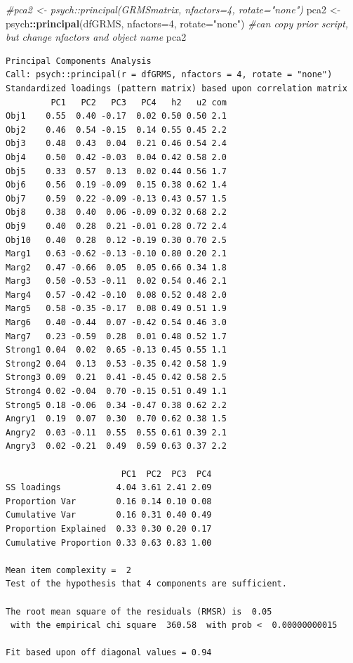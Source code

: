 \documentclass[
  english,
]{book}
\newenvironment{Shaded}{\begin{snugshade}}{\end{snugshade}}
\newcommand{\CommentTok}[1]{\textcolor[rgb]{0.56,0.35,0.01}{\textit{#1}}}
\newcommand{\DataTypeTok}[1]{\textcolor[rgb]{0.13,0.29,0.53}{#1}}
\newcommand{\DecValTok}[1]{\textcolor[rgb]{0.00,0.00,0.81}{#1}}
\newcommand{\KeywordTok}[1]{\textcolor[rgb]{0.13,0.29,0.53}{\textbf{#1}}}
\newcommand{\NormalTok}[1]{#1}
\newcommand{\OperatorTok}[1]{\textcolor[rgb]{0.81,0.36,0.00}{\textbf{#1}}}
\newcommand{\StringTok}[1]{\textcolor[rgb]{0.31,0.60,0.02}{#1}}
\begin{document}
\begin{Shaded}
\begin{Highlighting}[]
\CommentTok{#pca2 <- psych::principal(GRMSmatrix, nfactors=4, rotate="none")}
\NormalTok{pca2 <-}\StringTok{ }\NormalTok{psych}\OperatorTok{::}\KeywordTok{principal}\NormalTok{(dfGRMS, }\DataTypeTok{nfactors=}\DecValTok{4}\NormalTok{, }\DataTypeTok{rotate=}\StringTok{"none"}\NormalTok{) }\CommentTok{#can copy prior script, but change nfactors and object name}
\NormalTok{pca2}
\end{Highlighting}
\end{Shaded}

\begin{verbatim}
Principal Components Analysis
Call: psych::principal(r = dfGRMS, nfactors = 4, rotate = "none")
Standardized loadings (pattern matrix) based upon correlation matrix
         PC1   PC2   PC3   PC4   h2   u2 com
Obj1    0.55  0.40 -0.17  0.02 0.50 0.50 2.1
Obj2    0.46  0.54 -0.15  0.14 0.55 0.45 2.2
Obj3    0.48  0.43  0.04  0.21 0.46 0.54 2.4
Obj4    0.50  0.42 -0.03  0.04 0.42 0.58 2.0
Obj5    0.33  0.57  0.13  0.02 0.44 0.56 1.7
Obj6    0.56  0.19 -0.09  0.15 0.38 0.62 1.4
Obj7    0.59  0.22 -0.09 -0.13 0.43 0.57 1.5
Obj8    0.38  0.40  0.06 -0.09 0.32 0.68 2.2
Obj9    0.40  0.28  0.21 -0.01 0.28 0.72 2.4
Obj10   0.40  0.28  0.12 -0.19 0.30 0.70 2.5
Marg1   0.63 -0.62 -0.13 -0.10 0.80 0.20 2.1
Marg2   0.47 -0.66  0.05  0.05 0.66 0.34 1.8
Marg3   0.50 -0.53 -0.11  0.02 0.54 0.46 2.1
Marg4   0.57 -0.42 -0.10  0.08 0.52 0.48 2.0
Marg5   0.58 -0.35 -0.17  0.08 0.49 0.51 1.9
Marg6   0.40 -0.44  0.07 -0.42 0.54 0.46 3.0
Marg7   0.23 -0.59  0.28  0.01 0.48 0.52 1.7
Strong1 0.04  0.02  0.65 -0.13 0.45 0.55 1.1
Strong2 0.04  0.13  0.53 -0.35 0.42 0.58 1.9
Strong3 0.09  0.21  0.41 -0.45 0.42 0.58 2.5
Strong4 0.02 -0.04  0.70 -0.15 0.51 0.49 1.1
Strong5 0.18 -0.06  0.34 -0.47 0.38 0.62 2.2
Angry1  0.19  0.07  0.30  0.70 0.62 0.38 1.5
Angry2  0.03 -0.11  0.55  0.55 0.61 0.39 2.1
Angry3  0.02 -0.21  0.49  0.59 0.63 0.37 2.2

                       PC1  PC2  PC3  PC4
SS loadings           4.04 3.61 2.41 2.09
Proportion Var        0.16 0.14 0.10 0.08
Cumulative Var        0.16 0.31 0.40 0.49
Proportion Explained  0.33 0.30 0.20 0.17
Cumulative Proportion 0.33 0.63 0.83 1.00

Mean item complexity =  2
Test of the hypothesis that 4 components are sufficient.

The root mean square of the residuals (RMSR) is  0.05 
 with the empirical chi square  360.58  with prob <  0.00000000015 

Fit based upon off diagonal values = 0.94
\end{verbatim}
\end{document}
